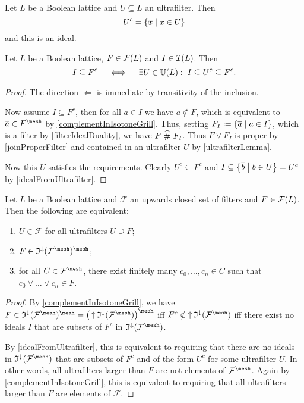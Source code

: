 \begin{lemma}
Let $L$ be a Boolean lattice and $U\subseteq L$ an ultrafilter. Then
\[ U^c = \setbuilder{\overline{x}}{x\in U} \]
and this is an ideal.
\end{lemma}

\begin{lemma} \label{idealFromUltrafilter}
Let $L$ be a Boolean lattice, $F\in \operatorname{\mathcal{F}}(L)$ and $I\in \operatorname{\mathcal{I}}(L)$. Then
\[ I \subseteq F^c \quad\iff\quad \exists U\in \operatorname{\mathbb{U}}(L): \; I \subseteq U^c \subseteq F^c. \]
\end{lemma}
\begin{proof}
The direction $\Leftarrow$ is immediate by transitivity of the inclusion.

Now assume $I \subseteq F^c$, then for all $a\in I$ we have $a\notin F$, which is equivalent to $\overline{a}\in F^\mesh$ by \ref{complementInIsotoneGrill}. Thus, setting $F_I \defeq \setbuilder{\overline{a}}{a\in I}$, which is a filter by \ref{filterIdealDuality}, we have $F \mathrel{\widehat{\#}} F_I$. Thus $F\vee F_I$ is proper by \ref{joinProperFilter} and contained in an ultrafilter $U$ by \ref{ultrafilterLemma}.

Now this $U$ satisfies the requirements. Clearly $U^c\subseteq F^c$ and $I \subseteq \setbuilder{\overline{b}}{b\in U} = U^c$ by \ref{idealFromUltrafilter}.
\end{proof}

\begin{proposition} \label{ChoquetModificationFilterSet}
Let $L$ be a Boolean lattice and $\mathcal{F}$ an upwards closed set of filters and $F\in \operatorname{\mathcal{F}}(L)$. Then the following are equivalent:
\begin{enumerate}
\item $U\in \mathcal{F}$ for all ultrafilters $U\supseteq F$;
\item $F\in \mathfrak{I}^\imf(\mathcal{F}^\mesh)^\mesh$;
\item for all $C\in \mathcal{F}^\mesh$, there exist finitely many $c_0,\ldots, c_n \in C$ such that $c_0 \vee \ldots \vee c_n \in F$.
\end{enumerate}
\end{proposition}
\begin{proof}
By \ref{complementInIsotoneGrill}, we have $F\in \mathfrak{I}^\imf(\mathcal{F}^\mesh)^\mesh = \big(\upset \mathfrak{I}^\imf(\mathcal{F}^\mesh)\big)^\mesh$ iff $F^c \notin \upset \mathfrak{I}^\imf(\mathcal{F}^\mesh)$ iff there exist no ideals $I$ that are subsets of $F^c$ in $\mathfrak{I}^\imf(\mathcal{F}^\mesh)$.

By \ref{idealFromUltrafilter}, this is equivalent to requiring that there are no ideals in $\mathfrak{I}^\imf(\mathcal{F}^\mesh)$ that are subsets of $F^c$ and of the form $U^c$ for some ultrafilter $U$. In other words, all ultrafilters larger than $F$ are not elements of $\mathcal{F}^\mesh$. Again by \ref{complementInIsotoneGrill}, this is equivalent to requiring that all ultrafilters larger than $F$ are elements of $\mathcal{F}$.
\end{proof}

